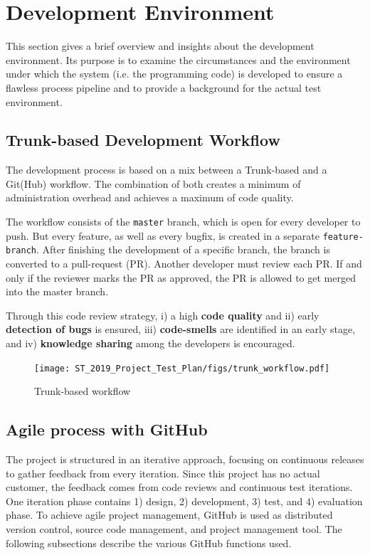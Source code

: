 \documentclass[a4paper]{article}
\begin{document}
\section{Development Environment}
This section gives a brief overview and insights about the development environment. Its purpose is to examine the circumstances and the environment under which the system (i.e. the programming code) is developed to ensure a flawless process pipeline and to provide a background for the actual test environment.

\subsection{Trunk-based Development Workflow}
\label{sec:trunk-workflow}
The development process is based on a mix between a Trunk-based and a Git(Hub) workflow. The combination of both creates a minimum of administration overhead and achieves a maximum of code quality.

The workflow consists of the \texttt{master} branch, which is open for every developer to push. But every feature, as well as every bugfix, is created in a separate \texttt{feature-branch}. After finishing the development of a specific branch, the branch is converted to a pull-request (PR). Another developer must review each PR. If and only if the reviewer marks the PR as approved, the PR is allowed to get merged into the master branch.

Through this code review strategy, i) a high \textbf{code quality} and ii) early \textbf{detection of bugs} is ensured, iii) \textbf{code-smells} are identified in an early stage, and iv) \textbf{knowledge sharing} among the developers is encouraged.

\begin{figure}[H]
\centering
    \texttt{[image: ST\_2019\_Project\_Test\_Plan/figs/trunk\_workflow.pdf]}
    \caption{Trunk-based workflow}
    \label{fig:trunk-workflow}
\end{figure}


\subsection{Agile process with GitHub}
\label{sec:agile}
The project is structured in an iterative approach, focusing on continuous releases to gather feedback from every iteration. Since this project has no actual customer, the feedback comes from code reviews and continuous test iterations. One iteration phase contains 1) design, 2) development, 3) test, and 4) evaluation phase. To achieve agile project management, GitHub is used as distributed version control, source code management, and project management tool. The following subsections describe the various GitHub functions used.
\end{document}
